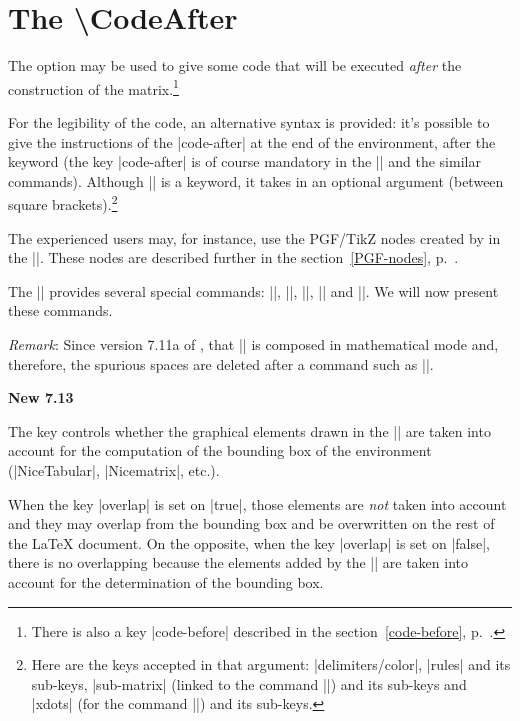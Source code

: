 \documentclass[dvipsnames]{article}
\begin{document}
\section{The \textbackslash CodeAfter}


\label{code-after}
The option  may be used to give some code that will be
executed \emph{after} the construction of the matrix.\footnote{There is also a
key |code-before| described in the section~\ref{code-before}, p.~\pageref{code-before}.}

\medskip
{}
For the legibility of the code, an alternative syntax is provided: it's
possible to give the instructions of the |code-after| at the end of the
environment, after the keyword  (the key
|code-after| is of course mandatory in the |\AutoNiceMatrix| and the
similar commands). Although |\CodeAfter| is a keyword, it takes in an optional
argument (between square brackets).\footnote{Here are the keys accepted in that argument:
|delimiters/color|, |rules| and its sub-keys, |sub-matrix| (linked to the
command |\SubMatrix|) and its sub-keys and |xdots| (for the command |\line|) and
its sub-keys.} 


\medskip
The experienced users may, for instance, use the PGF/TikZ nodes created by
 in the |\CodeAfter|. These nodes are described further
in the section~\ref{PGF-nodes}, p.~\pageref{PGF-nodes}.

\medskip
The |\CodeAfter| provides several special commands: |\line|, 
|\SubMatrix|, |\OverBrace|, |\UnderBrace| and |\TikzEveryCell|. We will now
present these commands. 

\medskip
\emph{Remark}: Since version 7.11a of , that |\CodeAfter| is composed
in mathematical mode and, therefore, the spurious spaces are deleted after a command such as
|\SubMatrix|.


\bigskip
\colorbox{yellow!50}{\bfseries New 7.13}

\smallskip
\nobreak
{}
The key  controls whether the graphical elements drawn in the
|\CodeAfter| are taken into account for the computation of the bounding box of
the environment (|{NiceTabular}|, |{Nicematrix}|, etc.).

When the key |overlap| is set on |true|, those elements are \emph{not} taken into
account and they may overlap from the bounding box and be overwritten on the rest of the
LaTeX document. On the opposite, when the key |overlap| is set on |false|, there is no
overlapping because the elements added by the |\CodeAfter| are taken into account for
the determination of the bounding box.
\end{document}
